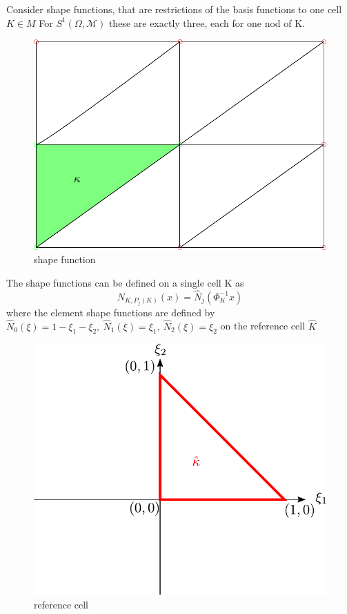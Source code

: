 \documentclass[english]{article}
\theoremstyle{definition}
\theoremstyle{remark}
\newcommand{\M}{\mathcal{M}}
\newcommand{\OO}{\Omega}
\begin{document}
Consider shape functions, that are restrictions of the basis functions to one cell $K \in M$ For $S^1(\OO,\M)$ these are exactly three, each for one nod of K. 
\begin{figure}[tbh]
  \begin{center}
    \includegraphics[width=\textwidth]{figs/shapeFunctions.pdf}
  \end{center}
  \caption{shape function}
  \label{shape-function-figure}
\end{figure}

The shape functions can be defined on a single cell K as 
$$N_{K,P_j(K)}(x) = \hat N_j(\Phi^{-1}_K x)$$
where the element shape functions are defined by $\hat N_0(\xi ) = 1 - \xi_1-\xi_2, \ \hat N_1(\xi) =\xi_1 , \ \hat N_2(\xi) = \xi_2  $ on the reference cell $\hat K$\\
\begin{figure}[tbh]
  \begin{center}
    \includegraphics[width=\textwidth]{figs/referenceCellKappaHat.pdf}
  \end{center}
  \caption{reference cell}
  \label{ref-cell-kappa-hat-figure}
\end{figure}
\end{document}
